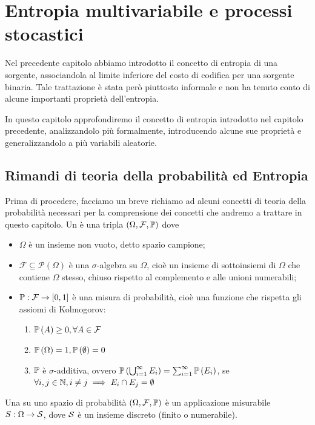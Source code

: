 \chapter{Entropia multivariabile e processi stocastici}

Nel precedente capitolo abbiamo introdotto il concetto di entropia di una sorgente, associandola al limite inferiore del costo di codifica per una sorgente binaria.
Tale trattazione è stata però piuttosto informale e non ha tenuto conto di alcune importanti proprietà dell'entropia.

In questo capitolo approfondiremo il concetto di entropia introdotto nel capitolo precedente, analizzandolo più formalmente, introducendo alcune sue proprietà e generalizzandolo a più variabili aleatorie.

\section{Rimandi di teoria della probabilità ed Entropia}

Prima di procedere, facciamo un breve richiamo ad alcuni concetti di teoria della probabilità necessari per la comprensione dei concetti che andremo a trattare in questo capitolo.
Un  è una tripla \((\Omega, \mathcal{F}, \Prob)\) dove
\begin{itemize}
  \item \(\Omega\) è un insieme non vuoto, detto spazio campione;
  \item \(\mathcal{F} \subseteq \mathcal{P}(\Omega)\) è una \(\sigma\)-algebra su \(\Omega\), cioè un insieme di sottoinsiemi di \(\Omega\) che contiene \(\Omega\) stesso, chiuso rispetto al complemento e alle unioni numerabili;
  \item \(\Prob: \mathcal{F} \to [0,1]\) è una misura di probabilità, cioè una funzione che rispetta gli assiomi di Kolmogorov:
    \begin{enumerate}
      \item \(\Prob[A] \geq 0, \forall A \in \mathcal{F}\)
      \item \(\Prob[\Omega] = 1, \Prob[\emptyset] = 0\)
      \item \(\Prob\) è \(\sigma\)-additiva, ovvero \(\Prob[\bigcup_{i=1}^\infty E_i] = \sum_{i=1}^{\infty} \Prob[E_i]\), se \(\forall i,j \in \mathbb{N}, i \neq j \implies E_i \cap E_j = \emptyset\)
    \end{enumerate}
\end{itemize}

Una  su uno spazio di probabilità \((\Omega, \mathcal{F}, \Prob)\) è un applicazione misurabile \(S: \Omega \to \mathcal{S}\), dove \(\mathcal{S}\) è un insieme discreto (finito o numerabile).

